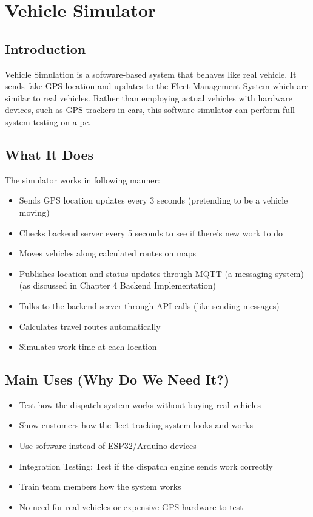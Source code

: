 

\maketitle

\chapter{Vehicle Simulator}

\section{Introduction}
Vehicle Simulation is a software-based system that behaves like real vehicle. It sends fake GPS location and updates to the Fleet Management System which are similar to real vehicles. Rather than employing actual vehicles with hardware devices, such as GPS trackers in cars, this software simulator can perform full system testing on a pc.

\section{What It Does}
The simulator works in following manner:
\begin{itemize}
    \item Sends GPS location updates every 3 seconds (pretending to be a vehicle moving)
    \item Checks backend server every 5 seconds to see if there’s new work to do
    \item Moves vehicles along calculated routes on maps
    \item Publishes location and status updates through MQTT (a messaging system) (as discussed in Chapter 4 Backend Implementation)
    \item Talks to the backend server through API calls (like sending messages)
    \item Calculates travel routes automatically
    \item Simulates work time at each location
\end{itemize}

\section{Main Uses (Why Do We Need It?)}
\begin{itemize}
    \item Test how the dispatch system works without buying real vehicles
    \item Show customers how the fleet tracking system looks and works
    \item Use software instead of ESP32/Arduino devices
    \item Integration Testing: Test if the dispatch engine sends work correctly
    \item Train team members how the system works
    \item No need for real vehicles or expensive GPS hardware to test
\end{itemize}

